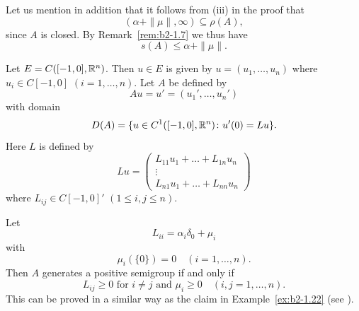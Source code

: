 Let us mention in addition that it follows from \upshape(iii) in the proof that 
%
\[
	(\alpha + \|\mu\|, \infty) \subseteq \rho(A) ,
\]
%
since $A$ is closed.
By Remark~\ref{rem:b2-1.7} we thus have
\begin{equation}\label{eq:b2-1.14}
s(A) \leq \alpha + \|\mu\|.
\end{equation}
\begin{example}\label{ex:b2-1.23}
Let $E = C([-1,0],\mathbb{R}^{n})$.
Then $u \in E$ is given by $u = (u_{1},\ldots,u_{n})$ where $u_{i} \in C[-1,0]$ $(i=1,\ldots,n)$.
Let $A$ be defined by 
%
\[
	Au = u' = (u_{1}',\ldots,u_{n}')
\]
% 
with domain 
%
\[
	D(A) = \{u \in C^{1}([-1,0],\mathbb{R}^{n}) \colon u'(0) = Lu\} .
\]
%
Here $L$ is defined by
\[
    Lu = \begin{pmatrix}
        L_{11}u_{1} + \dots + L_{1n}u_{n} \\
        \vdots \\
        L_{n1}u_{1} + \dots + L_{nn}u_{n}
    \end{pmatrix}
\]
where $L_{ij} \in C[-1,0]'$ $(1 \leq i,j \leq n)$.

Let 
%
\[
	 L_{ii} = \alpha_{i}\delta_{0} + \mu_{i}
\]
%
with
%
\[
	 \mu_{i}(\{0\}) = 0 \quad (i = 1, \ldots, n) .
\]
%
Then $A$ generates a positive semigroup if and only if 
\[
L_{ij} \geq 0 \text{ for } i \neq j \text{ and } \mu_{i} \geq 0 \quad (i,j = 1,\ldots,n) .
\]
This can be proved in a similar way as the claim in Example~\ref{ex:b2-1.22} 
(see \textcite{arendt:1984a}).
\end{example}

